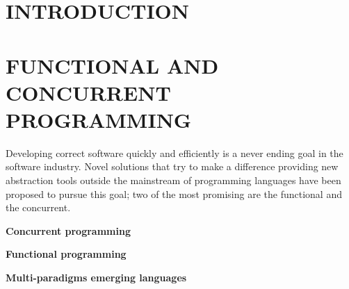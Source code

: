 \documentclass[a4paper,twoside]{article}
\newcommand{\simpleEntry}[1]{
\vspace{.3cm}
\noindent \textbf{#1}
\vspace{.3cm}
}
\begin{document}
\onecolumn \maketitle \normalsize \vfill

\section{\uppercase{Introduction}}
\label{sec:intro}
    

\section{\uppercase{Functional and concurrent programming}}
\label{sec:stateArt}
\noindent Developing correct software quickly and efficiently is a never ending goal in the software industry. Novel solutions that try to make a difference providing new abstraction tools outside the mainstream of programming languages have been proposed to pursue this goal; two of the most promising are the functional and the concurrent.





\simpleEntry{Concurrent programming}
    

\simpleEntry{Functional programming}
    

\simpleEntry{Multi-paradigms emerging languages} %
    
\end{document}
